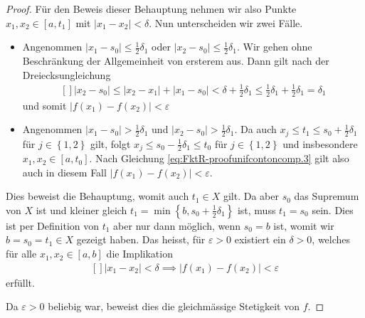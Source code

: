 \documentclass[../Analysis1_script.tex]{subfiles}
\begin{document}
\begin{proof}
	Für den Beweis dieser Behauptung nehmen wir also Punkte $x_1,x_2 \in [a,t_1]$ mit $|x_1-x_2| < \delta$. Nun unterscheiden wir zwei Fälle. 
	\begin{itemize}
		\item Angenommen $|x_1-s_0| \leq \frac {1}{2}\delta _1$ oder $|x_2-s_0| \leq \frac {1}{2}\delta _1$. Wir gehen ohne Beschränkung der Allgemeinheit von ersterem aus. Dann gilt nach der Dreiecksungleichung
		\[\begin{aligned}[]
			|x_2-s_0| \leq |x_2-x_1| + |x_1-s_0| < \delta + \tfrac {1}{2}\delta _1 \leq \tfrac {1}{2}\delta _1+\tfrac {1}{2}\delta _1 = \delta _1
		\end{aligned}\]
		und somit $|f(x_1)-f(x_2)| < \varepsilon$
		
		\item Angenommen $|x_1-s_0| > \frac {1}{2}\delta _1$ und $|x_2-s_0| > \frac {1}{2}\delta _1$. Da auch $x_j \leq t_1 \leq s_0 + \frac {1}{2} \delta _1$ für $j \in \left \lbrace {1,2} \right \rbrace$ gilt, folgt $x_j \leq s_0 - \frac {1}{2} \delta _1 \leq t_0$ für $j \in \left \lbrace {1,2} \right \rbrace$ und insbesondere $x_1,x_2 \in [a,t_0]$. Nach Gleichung \ref{eq:FktR-proofunifcontoncomp.3} gilt also auch in diesem Fall $|f(x_1)-f(x_2)| < \varepsilon$.
	\end{itemize}
	
	 Dies beweist die Behauptung, womit auch $t_1 \in X$ gilt. Da aber $s_0$ das Supremum von $X$ ist und kleiner gleich $t_1 = \min \left \lbrace {b,s_0+ \frac {1}{2} \delta _1} \right \rbrace$ ist, muss $t_1 = s_0$ sein. Dies ist per Definition von $t_1$ aber nur dann möglich, wenn $s_0 = b$ ist, womit wir $b = s_0 = t_1 \in X$ gezeigt haben. Das heisst, für $\varepsilon > 0$ existiert ein $\delta > 0$, welches für alle $x_1,x_2 \in [a,b]$ die Implikation
	\[\begin{aligned}[]
		|x_1-x_2| < \delta \implies |f(x_1)-f(x_2)|<\varepsilon
	\end{aligned}\]
	erfüllt. 
	
	Da $\varepsilon > 0$ beliebig war, beweist dies die gleichmässige Stetigkeit von $f$. 
\end{proof}
\end{document}
